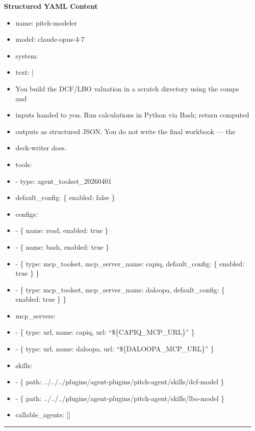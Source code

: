 \documentclass[11pt]{article}
\begin{document}
\textbf{Structured YAML Content}
\begin{itemize}[leftmargin=*,itemsep=2pt,topsep=2pt]
\item {} name: pitch-modeler
\item {} model: claude-opus-4-7
\item {} system:
\item {} text: |
\item {} You build the DCF/LBO valuation in a scratch directory using the comps and
\item {} inputs handed to you. Run calculations in Python via Bash; return computed
\item {} outputs as structured JSON. You do not write the final workbook — the
\item {} deck-writer does.
\item {} tools:
\item {} - type: agent\_\allowbreak{}toolset\_\allowbreak{}20260401
\item {} default\_\allowbreak{}config: \{ enabled: false \}
\item {} configs:
\item {} - \{ name: read, enabled: true \}
\item {} - \{ name: bash, enabled: true \}
\item {} - \{ type: mcp\_\allowbreak{}toolset, mcp\_\allowbreak{}server\_\allowbreak{}name: capiq, default\_\allowbreak{}config: \{ enabled: true \} \}
\item {} - \{ type: mcp\_\allowbreak{}toolset, mcp\_\allowbreak{}server\_\allowbreak{}name: daloopa, default\_\allowbreak{}config: \{ enabled: true \} \}
\item {} mcp\_\allowbreak{}servers:
\item {} - \{ type: url, name: capiq, url: ``\$\{CAPIQ\_\allowbreak{}MCP\_\allowbreak{}URL\}'' \}
\item {} - \{ type: url, name: daloopa, url: ``\$\{DALOOPA\_\allowbreak{}MCP\_\allowbreak{}URL\}'' \}
\item {} skills:
\item {} - \{ path: ../../../plugins/agent-plugins/pitch-agent/skills/dcf-model \}
\item {} - \{ path: ../../../plugins/agent-plugins/pitch-agent/skills/lbo-model \}
\item {} callable\_\allowbreak{}agents: []
\end{itemize}

\vspace{0.8em}\hrule\vspace{0.8em}
\end{document}

